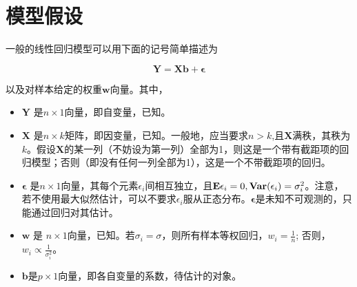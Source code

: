 \section{模型假设}

一般的线性回归模型可以用下面的记号简单描述为

\begin{equation}
  \bm {Y} = \bm{X} \bm{b} + \bm{\epsilon}
\end{equation}

以及对样本给定的权重$\bm{w}$向量。其中，

\begin{itemize}
  \item $\bm{Y}$ 是$n\times 1$向量，即自变量，已知。
  \item $\bm{X}$ 是$n\times k$矩阵，即因变量，已知。一般地，应当要求$n>k$,且$\bm{X}$满秩，其秩为$k$。假设$\bm{X}$的某一列（不妨设为第一列）全部为1，则这是一个带有截距项的回归模型；否则（即没有任何一列全部为1），这是一个不带截距项的回归。
  \item $\bm{\epsilon}$ 是$n\times 1$向量，其每个元素$\epsilon_i$间相互独立，且$\mathbf{E} \epsilon_i=0, \mathbf{Var}(\epsilon_i)=\sigma_i^2$。注意，若不使用最大似然估计，可以不要求$\epsilon_i$服从正态分布。$\bm{\epsilon}$是未知不可观测的，只能通过回归对其估计。
  \item $\bm{w}$ 是 $n\times 1$向量，已知。若$\sigma_i = \sigma$，则所有样本等权回归，$w_i = \frac{1}{n}$; 否则，$w_i \propto \frac{1}{\sigma_i^2}$。
  \item $\bm{b}$是$p\times 1$向量，即各自变量的系数，待估计的对象。
\end{itemize}

